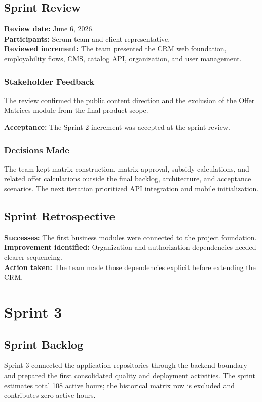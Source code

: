 \documentclass[letterpaper%
, oneside%
, 12pt%
, memoireprojet%
, english%
,creativecommons,hyperref, withAlgo2e %
]{thETS}
\begin{document}
\subsection{Sprint Review}
\textbf{Review date:} June 6, 2026.\\
\textbf{Participants:} Scrum team and client representative.\\
\textbf{Reviewed increment:} The team presented the CRM web foundation, employability flows, CMS,
catalog API, organization, and user management.

\subsubsection{Stakeholder Feedback}
The review confirmed the public content direction and the exclusion of the Offer Matrices module
from the final product scope.

\textbf{Acceptance:} The Sprint 2 increment was accepted at the sprint review.

\subsubsection{Decisions Made}
The team kept matrix construction, matrix approval, subsidy calculations, and related offer
calculations outside the final backlog, architecture, and acceptance scenarios. The next
iteration prioritized API integration and mobile initialization.

\subsection{Sprint Retrospective}
\textbf{Successes:} The first business modules were connected to the project foundation.\\
\textbf{Improvement identified:} Organization and authorization dependencies needed clearer sequencing.\\
\textbf{Action taken:} The team made those dependencies explicit before extending the CRM.

\section{Sprint 3}
\subsection{Sprint Backlog}
Sprint 3 connected the application repositories through the backend boundary and prepared the
first consolidated quality and deployment activities. The sprint estimates total 108 active hours;
the historical matrix row is excluded and contributes zero active hours.
\end{document}
